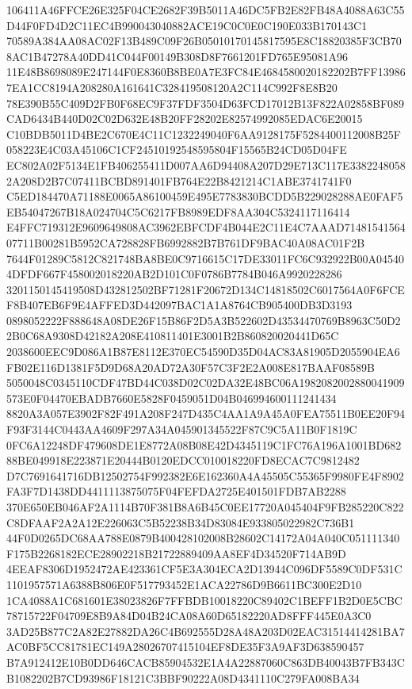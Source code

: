 \documentclass[UTF8,fontset=fandol,zihao=-4,a4paper]{ctexart}
\begin{document}
{{106411A46FFCE26E325F04CE2682F39B5011A46DC5FB2E82FB48A4088A63C55D44F0FD4D2C11EC4B990043040882ACE19C0C0E0C190E033B170143C1
70589A384AA08AC02F13B489C09F26B05010170145817595E8C18820385F3CB708AC1B47278A40DD41C044F00149B308D8F7661201FD765E95081A96
11E48B8698089E247144F0E8360B8BE0A7E3FC84E4684580020182202B7FF139867EA1CC8194A208280A161641C328419508120A2C114C992F8E8B20
78E390B55C409D2FB0F68EC9F37FDF3504D63FCD17012B13F822A02858BF089CAD6434B440D02C02D632E48B20FF28202E82574992085EDAC6E20015
C10BDB5011D4BE2C670E4C11C1232249040F6AA9128175F5284400112008B25F058223E4C03A45106C1CF24510192548595804F15565B24CD05D04FE
EC802A02F5134E1FB406255411D007AA6D94408A207D29E713C117E33822480582A208D2B7C07411BCBD891401FB764E22B8421214C1ABE3741741F0
C5ED184470A71188E0065A86100459E495E7783830BCDD5B229028288AE0FAF5EB54047267B18A024704C5C6217FB8989EDF8AA304C5324117116414
E4FFC719312E9609649808AC3962EBFCDF4B044E2C11E4C7AAAD7148154156407711B00281B5952CA728828FB6992882B7B761DF9BAC40A08AC01F2B
7644F01289C5812C821748BA8BE0C9716615C17DE33011FC6C932922B00A045404DFDF667F458002018220AB2D101C0F0786B7784B046A9920228286
3201150145419508D432812502BF71281F20672D134C14818502C6017564A0F6FCEF8B407EB6F9E4AFFED3D442097BAC1A1A8764CB905400DB3D3193
0898052222F888648A08DE26F15B86F2D5A3B522602D43534470769B8963C50D22B0C68A9308D42182A208E410811401E3001B2B860820020441D65C
2038600EEC9D086A1B87E8112E370EC54590D35D04AC83A81905D2055904EA6FB02E116D1381F5D9D68A20AD72A30F57C3F2E2A008E817BAAF08589B
5050048C0345110CDF47BD44C038D02C02DA32E48BC06A1982082002880041909573E0F04470EBADB7660E5828F0459051D04B046994600111241434
8820A3A057E3902F82F491A208F247D435C4AA1A9A45A0FEA75511B0EE20F94F93F3144C0443AA4609F297A34A045901345522F87C9C5A11B0F1819C
0FC6A12248DF479608DE1E8772A08B08E42D4345119C1FC76A196A1001BD68288BE049918E223871E20444B0120EDCC010018220FD8ECAC7C9812482
D7C7691641716DB12502754F992382E6E162360A4A45505C55365F9980FE4F8902FA3F7D1438DD4411113875075F04FEFDA2725E401501FDB7AB2288
370E650EB046AF2A1114B70F381B8A6B45C0EE17720A045404F9FB285220C822C8DFAAF2A2A12E226063C5B52238B34D83084E933805022982C736B1
44F0D0265DC68AA788E0879B400428102008B28602C14172A04A040C051111340F175B2268182ECE28902218B21722889409AA8EF4D34520F714AB9D
4EEAF8306D1952472AE423361CF5E3A304ECA2D13944C096DF5589C0DF531C1101957571A6388B806E0F517793452E1ACA22786D9B6611BC300E2D10
1CA4088A1C681601E38023826F7FFBDB10018220C89402C1BEFF1B2D0E5CBC78715722F04709E8B9A84D04B24CA08A60D65182220AD8FFF445E0A3C0
3AD25B877C2A82E27882DA26C4B692555D28A48A203D02EAC31514414281BA7AC0BF5CC81781EC149A28026707415104EF8DE35F3A9AF3D638590457
B7A912412E10B0DD646CACB85904532E1A4A22887060C863DB40043B7FB343CB1082202B7CD93986F18121C3BBF90222A08D4341110C279FA008BA34
}}
\end{document}
